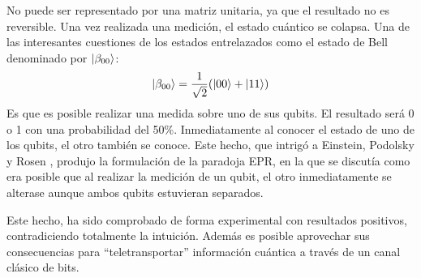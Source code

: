 No puede ser representado por una matriz unitaria, ya que el resultado no es 
reversible.  Una vez realizada una medición, el estado cuántico se colapsa. Una 
de las interesantes cuestiones de los estados entrelazados como el estado de 
Bell denominado por $\ket{\beta_{00}}$:
%
$$ \ket{\beta_{00}} = \frac{1}{\sqrt{2}}(\ket{00} + \ket{11}) $$
%
Es que es posible realizar una medida sobre uno de sus qubits. El resultado será 
0 o 1 con una probabilidad del 50\%. Inmediatamente al conocer el estado de uno 
de los qubits, el otro también se conoce. Este hecho, que intrigó a Einstein, 
Podolsky y Rosen \cite{EPR}, produjo la formulación de la paradoja EPR, en la 
que se discutía como era posible que al realizar la medición de un qubit, el 
otro inmediatamente se alterase aunque ambos qubits estuvieran separados.

Este hecho, ha sido comprobado de forma experimental con resultados positivos, 
contradiciendo totalmente la intuición. Además es posible aprovechar sus 
consecuencias para ``teletransportar'' información cuántica a través de un canal 
clásico de bits.
